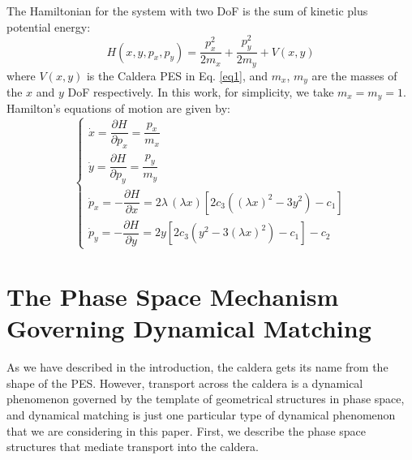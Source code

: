 \documentclass[a4paper,10pt]{article}
\begin{document}
The Hamiltonian for the system with two DoF is the sum of kinetic plus potential energy:
\begin{equation}
H(x,y,p_x,p_y) = \frac{p_x^2}{2m_x} + \frac{p_y^2}{2m_y} + V(x,y)
\label{eq2}
\end{equation}
\noindent
where $V(x,y)$ is the Caldera PES in Eq. \eqref{eq1}, and $m_x$, $m_y$ are the masses of the $x$ and $y$ DoF respectively. In this work, for simplicity, we take $m_x = m_y = 1$. Hamilton's equations of motion are given by:
\begin{equation}
\begin{cases}
\dot x = \dfrac{\partial H} {\partial p_x} = \dfrac{p_x}{m_x} \\[.4cm]
\dot y = \dfrac{\partial H} {\partial p_y} = \dfrac{p_y}{m_y} \\[.4cm]
\dot p_x = -\dfrac{\partial H} {\partial x} = 2 \lambda \, (\lambda x) \left[2c_3 \left((\lambda x)^2 - 3 y^2 \right) - c_1 \right] \\[.4cm]
\dot p_y = -\dfrac {\partial H} {\partial y} = 2 y \left[ 2 c_3 \left(y^2 - 3 (\lambda x)^2\right) - c_1 \right] - c_2
\end{cases}
\label{eq3}
\end{equation}
 
 
\section{The Phase Space Mechanism Governing Dynamical Matching}
\label{DM_mech}

As we have described in the introduction, the caldera gets its name from the shape of the PES. However, transport across the caldera is a dynamical phenomenon governed by the template of geometrical structures in phase space, and dynamical matching is just one particular type of  dynamical phenomenon that we are considering in this paper. First, we describe the phase space structures that mediate transport into the caldera.
\end{document}
